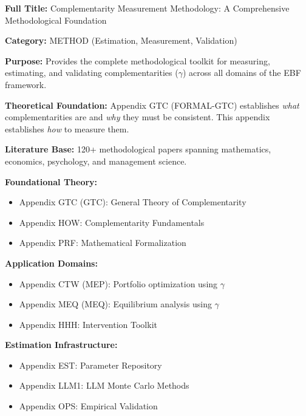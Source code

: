 \begin{tcolorbox}[colback=orange!5!white,colframe=orange!75!black,title=\textbf{Appendix CMP: METHOD-COMP}]
\textbf{Full Title:} Complementarity Measurement Methodology: A Comprehensive Methodological Foundation

\textbf{Category:} METHOD (Estimation, Measurement, Validation)

\textbf{Purpose:} Provides the complete methodological toolkit for measuring, estimating, and validating complementarities ($\gamma$) across all domains of the EBF framework.

\textbf{Theoretical Foundation:} Appendix GTC (FORMAL-GTC) establishes \textit{what} complementarities are and \textit{why} they must be consistent. This appendix establishes \textit{how} to measure them.

\textbf{Literature Base:} 120+ methodological papers spanning mathematics, economics, psychology, and management science.
\end{tcolorbox}

\begin{tcolorbox}[colback=gray!5!white,colframe=gray!75!black,title=\textbf{Cross-Reference Map}]
\small
\textbf{Foundational Theory:}
\begin{itemize}[noitemsep]
    \item Appendix GTC (GTC): General Theory of Complementarity
    \item Appendix HOW: Complementarity Fundamentals
    \item Appendix PRF: Mathematical Formalization
\end{itemize}

\textbf{Application Domains:}
\begin{itemize}[noitemsep]
    \item Appendix CTW (MEP): Portfolio optimization using $\gamma$
    \item Appendix MEQ (MEQ): Equilibrium analysis using $\gamma$
    \item Appendix HHH: Intervention Toolkit
\end{itemize}

\textbf{Estimation Infrastructure:}
\begin{itemize}[noitemsep]
    \item Appendix EST: Parameter Repository
    \item Appendix LLM1: LLM Monte Carlo Methods
    \item Appendix OPS: Empirical Validation
\end{itemize}
\end{tcolorbox}

